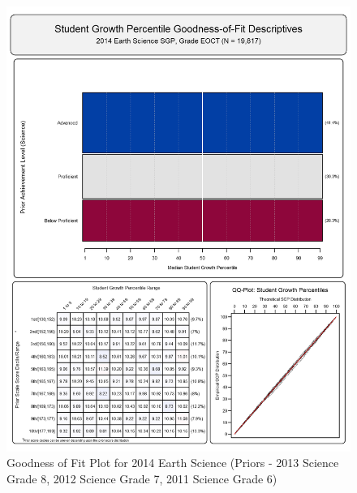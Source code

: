 \documentclass[12pt]{article}
\begin{document}
\begin{figure}[htbp]
\centering
\includegraphics{../img/Goodness_of_Fit/EARTH_SCIENCE.2014/2014_EARTH_SCIENCE_EOCT;2013_SCIENCE_8;2012_SCIENCE_7;2011_SCIENCE_6.png}
\caption{Goodness of Fit Plot for 2014 Earth Science (Priors - 2013
Science Grade 8, 2012 Science Grade 7, 2011 Science Grade 6)}
\end{figure}
\end{document}
